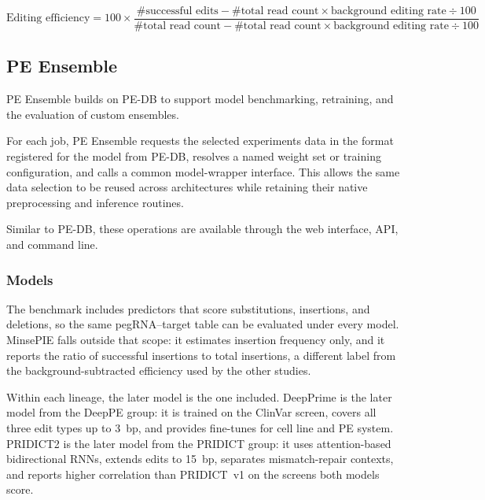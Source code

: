 \documentclass{article}
\begin{document}

\begin{equation}
    \text{Editing efficiency} = 100 \times \frac{\text{\# successful edits} - \text{\# total read count} \times \text{background editing rate} \div 100}{\text{\# total read count} - \text{\# total read count} \times \text{background editing rate} \div 100}
    \label{eq:augmented-editing-efficiency}
\end{equation}

\subsection{PE Ensemble}

PE Ensemble builds on PE-DB to support model benchmarking, retraining, and the evaluation of custom ensembles.

For each job, PE Ensemble requests the selected experiments data in the format registered for the model from PE-DB, resolves a named weight set or training configuration, and calls a common model-wrapper interface. This allows the same data selection to be reused across architectures while retaining their native preprocessing and inference routines.

Similar to PE-DB, these operations are available through the web interface, API, and command line.

\subsubsection{Models}
\label{subsubsection:models}

The benchmark includes predictors that score substitutions, insertions, and deletions, so the same pegRNA--target table can be evaluated under every model. MinsePIE\cite{koeppelPredictionPrimeEditing2023} falls outside that scope: it estimates insertion frequency only, and it reports the ratio of successful insertions to total insertions, a different label from the background-subtracted efficiency used by the other studies. 

Within each lineage, the later model is the one included. DeepPrime\cite{yuPredictionEfficienciesDiverse2023} is the later model from the DeepPE group\cite{kimPredictingEfficiencyPrime2021}: it is trained on the ClinVar screen, covers all three edit types up to 3~bp, and provides fine-tunes for cell line and PE system. PRIDICT2\cite{mathisMachineLearningPrediction2024} is the later model from the PRIDICT group\cite{schwankgeraldPredictingPrimeEditing2023}: it uses attention-based bidirectional RNNs, extends edits to 15~bp, separates mismatch-repair contexts, and reports higher correlation than PRIDICT~v1 on the screens both models score. 
\end{document}

